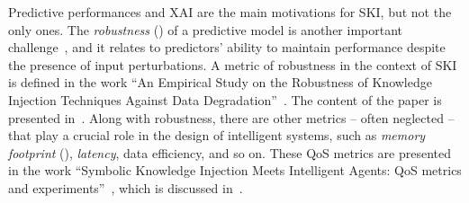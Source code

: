 Predictive performances and \gls{XAI} are the main motivations for \gls{SKI}, but not the only ones.
%
The \emph{robustness} () of a predictive model is another important challenge~\cite{DBLP:conf/eccv/LiuCZH18}, and it relates to predictors' ability to maintain performance despite the presence of input perturbations.
%
A metric of robustness in the context of \gls{SKI} is defined in the work ``An Empirical Study on the Robustness of Knowledge Injection Techniques Against Data Degradation''~\cite{DBLP:conf/woa/RafanelliMACO24}.
%
The content of the paper is presented in~.
%
Along with robustness, there are other metrics -- often neglected -- that play a crucial role in the design of intelligent systems, such as \emph{memory footprint} (), \emph{latency}, data efficiency, and so on.
%
These \gls{QoS} metrics are presented in the work ``Symbolic Knowledge Injection Meets Intelligent Agents: QoS metrics and experiments''~\cite{DBLP:journals/aamas/AgiolloRMCO23}, which is discussed in~.


